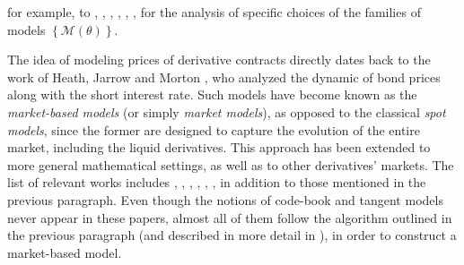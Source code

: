 \documentclass{article}
\numberwithin{equation}{section}
\begin{document}
for example, to \cite{carmona2009localvol}, \cite{carmona2010tangentlevy}, \cite{kallsen2010HJM}, \cite{Zhao2010dtl}, \cite{emmanuel2014discrete}, \cite{richter2014discretetime}, for the analysis of specific choices of the families of models $\left\{\mathcal{M}(\theta)\right\}$.


The idea of modeling prices of derivative contracts directly dates back to the work of Heath, Jarrow and Morton \cite{heath1992bond}, who analyzed the dynamic of bond prices along with the short interest rate. Such models have become known as the \emph{market-based models} (or simply \emph{market models}), as opposed to the classical \emph{spot models}, since the former are designed to capture the evolution of the entire market, including the liquid derivatives. This approach has been extended to more general mathematical settings, as well as to other derivatives' markets. The list of relevant works includes \cite{derman1998tree}, \cite{schonbucher1999market}, \cite{Schonbucher.credit}, \cite{schweizer2008term}, \cite{schweizer2008arbitrage}, \cite{damir2012bridge}, in addition to those mentioned in the previous paragraph. Even though the notions of code-book and tangent models never appear in these papers, almost all of them follow the algorithm outlined in the previous paragraph (and described in more detail in \cite{carmona2011tangentlevy}), in order to construct a market-based model.
\end{document}
